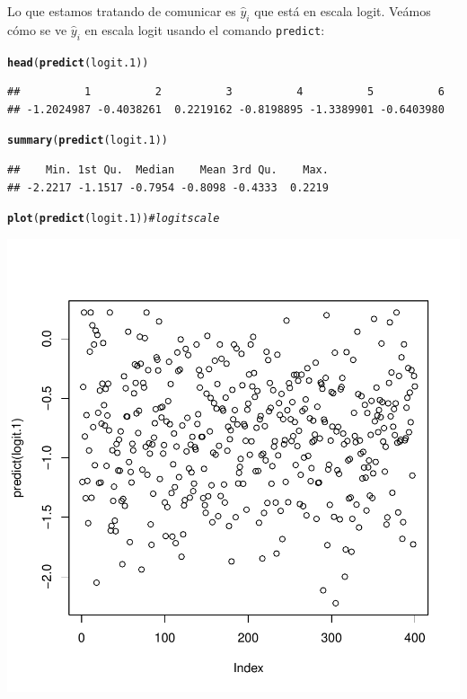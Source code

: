 \documentclass[onesided]{article}\usepackage[]{graphicx}\usepackage[]{color}
\makeatletter
\def\maxwidth{ %
  \ifdim\Gin@nat@width>\linewidth
    \linewidth
  \else
    \Gin@nat@width
  \fi
}
\newcommand{\hlcom}[1]{\textcolor[rgb]{0.678,0.584,0.686}{\textit{#1}}}%
\newcommand{\hlstd}[1]{\textcolor[rgb]{0.345,0.345,0.345}{#1}}%
\newcommand{\hlkwd}[1]{\textcolor[rgb]{0.737,0.353,0.396}{\textbf{#1}}}%
\newenvironment{kframe}{%
 \def\at@end@of@kframe{}%
 \ifinner\ifhmode%
  \def\at@end@of@kframe{\end{minipage}}%
  \begin{minipage}{\columnwidth}%
 \fi\fi%
 \def\FrameCommand##1{\hskip\@totalleftmargin \hskip-\fboxsep
 \colorbox{shadecolor}{##1}\hskip-\fboxsep
     \hskip-\linewidth \hskip-\@totalleftmargin \hskip\columnwidth}%
 \MakeFramed {\advance\hsize-\width
   \@totalleftmargin\z@ \linewidth\hsize
   \@setminipage}}%
 {\par\unskip\endMakeFramed%
 \at@end@of@kframe}
\newenvironment{knitrout}{}{} %
\makeatother
\begin{document}
Lo que estamos tratando de comunicar es $\hat y_{i}$ que est\'a en escala logit. Ve\'amos c\'omo se ve $\hat y_{i}$ en escala logit usando el comando \texttt{predict}:


\begin{knitrout}
\color{fgcolor}\begin{kframe}
\begin{alltt}
\hlkwd{head}\hlstd{(}\hlkwd{predict}\hlstd{(logit.1))}
\end{alltt}
\begin{verbatim}
##          1          2          3          4          5          6 
## -1.2024987 -0.4038261  0.2219162 -0.8198895 -1.3389901 -0.6403980
\end{verbatim}
\begin{alltt}
\hlkwd{summary}\hlstd{(}\hlkwd{predict}\hlstd{(logit.1))}
\end{alltt}
\begin{verbatim}
##    Min. 1st Qu.  Median    Mean 3rd Qu.    Max. 
## -2.2217 -1.1517 -0.7954 -0.8098 -0.4333  0.2219
\end{verbatim}
\begin{alltt}
\hlkwd{plot}\hlstd{(}\hlkwd{predict}\hlstd{(logit.1))} \hlcom{# logit scale}
\end{alltt}
\end{kframe}

{\centering \includegraphics[width=\maxwidth]{figure/predict:1-1} 

}



\end{knitrout}
\end{document}
